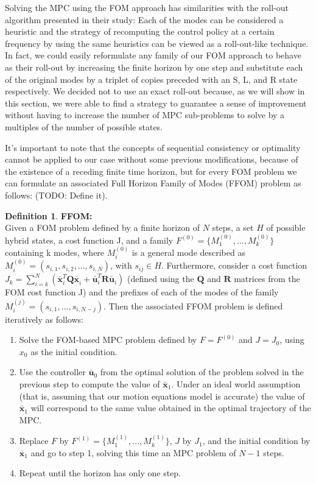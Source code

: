 \documentclass[12,twoside]{TFG-GM}
\theoremstyle{definition}
\newtheorem{definition}[theorem]{Definition}
\theoremstyle{remark}
\newcommand*\diff[1]{\bar{#1}}
\begin{document}
Solving the MPC using the FOM approach has similarities with the roll-out algorithm presented in their study: Each of the modes can be considered a heuristic and the strategy of recomputing the control policy at a certain frequency by using the same heuristics can be viewed as a roll-out-like technique. In fact, we could easily reformulate any family of our FOM approach to behave as their roll-out by increasing the finite horizon by one step and substitute each of the original modes by a triplet of copies preceded with an S, L, and R state respectively. We decided not to use an exact roll-out because, as we will show in this section, we were able to find a strategy to guarantee a sense of improvement without having to increase the number of MPC sub-problems to solve by a multiples of the number of possible states.

It's important to note that the concepts of sequential consistency or optimality cannot be applied to our case without some previous modifications, because of the existence of a receding finite time horizon, but for every FOM problem we can formulate an associated Full Horizon Family of Modes (FFOM) problem as follows: (TODO: Define it).

\begin{definition} {\textbf{FFOM:}}\\
Given a FOM problem defined by a finite horizon of $N$ steps, a set $H$ of possible hybrid states, a cost function J, and a family $F^{(0)} = \{M_1^{(0)}, ..., M_k^{(0)}\}$ containing k modes, where $M_i^{(0)}$ is a general mode described as $M_i^{(0)} = (s_{i,1}, s_{i,2}, ..., s_{i,N})$, with $s_{ij} \in H$. Furthermore, consider a cost function $J_k = \sum\limits_{i = k}^{N} \left( \diff{\textbf{x}}_i^T \textbf{Q} \diff{\textbf{x}}_i^{} + \diff{\textbf{u}}_{i}^T \textbf{R} \diff{\textbf{u}}_{i}^{} \right)$ (defined using the $\textbf{Q}$ and $\textbf{R}$ matrices from the FOM cost function J) and the prefixes of each of the modes of the family $M_i^{(j)} = (s_{i,1}, ..., s_{i,N-j})$. Then the associated FFOM problem is defined iteratively as follows:

\begin{enumerate}
\item Solve the FOM-based MPC problem defined by $F = F^{(0)}$ and $J = J_0$, using $x_0$ as the initial condition.
\item Use the controller $\diff{\textbf{u}}_0$ from the optimal solution of the problem solved in the previous step to compute the value of $\diff{\textbf{x}}_1$. Under an ideal world assumption (that is, assuming that our motion equations model is accurate) the value of $\diff{\textbf{x}}_1$ will correspond to the same value obtained in the optimal trajectory of the MPC.
\item Replace $F$ by  $F^{(1)} = \{M_1^{(1)}, ..., M_k^{(1)}\}$, $J$ by $J_1$, and the initial condition by $\diff{\textbf{x}}_1$ and go to step 1, solving this time an MPC problem of $N - 1$ steps.
\item Repeat until the horizon has only one step.
\end{enumerate}

\end{definition}
\end{document}
